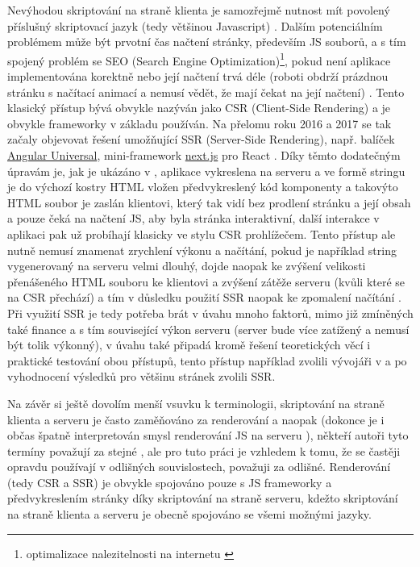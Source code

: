         Nevýhodou skriptování na straně klienta je samozřejmě nutnost mít povolený příslušný skriptovací jazyk (tedy většinou Javascript) \cite{scripting-sqa}. Dalším potenciálním problémem může být prvotní čas načtení stránky, především JS souborů, a s tím spojený problém se SEO (Search Engine Optimization)\footnote{optimalizace nalezitelnosti na internetu \cite{seo}}, pokud není aplikace implementována korektně nebo její načtení trvá déle (roboti obdrží prázdnou stránku s načítací animací a nemusí vědět, že mají čekat na její načtení) \cite{scripting-freecodecamp,scripting-hackernoon}. Tento klasický přístup bývá obvykle nazýván jako CSR (Client-Side Rendering) a je obvykle frameworky v základu používán. Na přelomu roku 2016 a 2017 se tak začaly objevovat řešení umožňující SSR (Server-Side Rendering), např. balíček \href{https://github.com/angular/universal}{Angular Universal}, mini-framework \href{https://github.com/zeit/next.js/}{next.js} pro React \cite{scripting-hackernoon}. Díky těmto dodatečným úpravám je, jak je ukázáno v \cite{scripting-ytb}, aplikace vykreslena na serveru a ve formě stringu je do výchozí kostry HTML vložen předvykreslený kód komponenty a takovýto HTML soubor je zaslán klientovi, který tak vidí bez prodlení stránku a její obsah a pouze čeká na načtení JS, aby byla stránka interaktivní, další interakce v aplikaci pak už probíhají klasicky ve stylu CSR prohlížečem. Tento přístup ale nutně nemusí znamenat zrychlení výkonu a načítání, pokud je například string vygenerovaný na serveru velmi dlouhý, dojde naopak ke zvýšení velikosti přenášeného HTML souboru ke klientovi a zvýšení zátěže serveru (kvůli které se na CSR přechází) a tím v důsledku použití SSR naopak ke zpomalení načítání \cite{scripting-hackernoon}. Při využití SSR je tedy potřeba brát v úvahu mnoho faktorů, mimo již zmíněných také finance a s tím související výkon serveru (server bude více zatížený a nemusí být tolik výkonný), v úvahu také připadá kromě řešení teoretických věcí i praktické testování obou přístupů, tento přístup například zvolili vývojáři v \cite{scripting-benchmark} a po vyhodnocení výsledků pro většinu stránek zvolili SSR.
        
        Na závěr si ještě dovolím menší vsuvku k terminologii, skriptování na straně klienta a serveru je často zaměňováno za renderování a naopak (dokonce je i občas špatně interpretován smysl renderování JS na serveru \cite{scripting-chyby}), někteří autoři tyto termíny považují za stejné \cite{scripting-freecodecamp}, ale pro tuto práci je vzhledem k tomu, že se častěji opravdu používají v odlišných souvislostech, považuji za odlišné. Renderování (tedy CSR a SSR) je obvykle spojováno pouze s JS frameworky a předvykreslením stránky díky skriptování na straně serveru, kdežto skriptování na straně klienta a serveru je obecně spojováno se všemi možnými jazyky.
    
